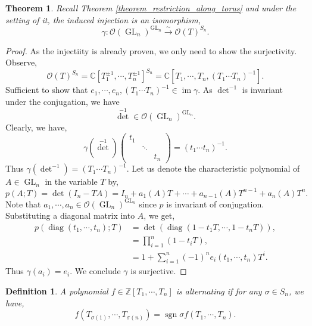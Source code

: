 \documentclass{article}
\newtheorem{theorem}{Theorem} [section]
\newtheorem{definition}{Definition}[section]
\numberwithin{equation}{theorem}
\DeclareMathOperator{\diag}{diag}
\DeclareMathOperator{\GL}{GL}
\DeclareMathOperator{\image}{im}
\DeclareMathOperator{\sgn}{sgn}
\newcommand{\Ouv}[0]{\mathcal{O}}
\newcommand{\Z}[0]{\mathbb{Z}}
\newcommand{\C}[0]{\mathbb{C}}
\begin{document}
\begin{theorem}
    Recall Theorem \ref{theorem_restriction_along_torus} and under the setting of it, the induced injection is an isomorphism,
    \begin{equation*}
        \gamma:\Ouv(\GL_n)^{\GL_n}\stackrel{\sim}{\to}\Ouv(T)^{S_n}.
    \end{equation*}
\end{theorem}
\begin{proof}
    As the injectiity is already proven, we only need to show the surjectivity. Observe,
    \begin{equation*}
        \Ouv(T)^{S_n} = \C[T_1^{\pm1},\cdots,T_n^{\pm1}]^{S_n}=\C[T_1,\cdots,T_n,(T_1\cdots T_n)^{-1}].
    \end{equation*}
    Sufficient to show that $e_1,\cdots,e_n,(T_1\cdots T_n)^{-1}\in\image \gamma$. As $\det^{-1}$ is invariant under the conjugation, we have 
    \begin{equation*}
        \det^{-1}\in\Ouv(\GL_n)^{\GL_n}.
    \end{equation*}
    Clearly, we have,
    \begin{equation*}
        \gamma(\det^{-1})\begin{pmatrix}
            t_1&\:&\:\\
            \: & \ddots &\:\\
            \: & \: & t_n
        \end{pmatrix}=(t_1\cdots t_n)^{-1}.
    \end{equation*}
    Thus $\gamma(\det^{-1}) = (T_1\cdots T_n)^{-1}$. Let us denote the characteristic polynomial of $A\in\GL_n$ in the variable $T$ by,
    \begin{equation*}
        p(A;T) = \det(I_n-TA) = I_n+a_1(A)T+\cdots+a_{n-1}(A)T^{n-1}+a_n(A)T^n.
    \end{equation*}
    Note that $a_1,\cdots,a_n\in\Ouv(\GL_n)^{\GL_n}$ since $p$ is invariant of conjugation. Substituting a diagonal matrix into $A$, we get,
    \begin{align*}
        p(\diag(t_1,\cdots,t_n);T) &= \det(\diag(1-t_1T,\cdots,1-t_nT)),\\
        &= \prod_{i=1}^n(1-t_iT) ,\\
        &= 1+\sum_{i=1}^n(-1)^ne_i(t_1,\cdots,t_n)T^i.
    \end{align*}
    Thus $\gamma(a_i) = e_i$. We conclude $\gamma$ is surjective.
\end{proof}
\begin{definition}
    A polynomial $f\in\Z[T_1,\cdots,T_n]$ is alternating if for any $\sigma\in S_n$, we have,
    \begin{equation*}
        f(T_{\sigma(1)},\cdots,T_{\sigma(n)}) = \sgn\sigma f(T_1,\cdots,T_n).
    \end{equation*}
\end{definition}
\end{document}
